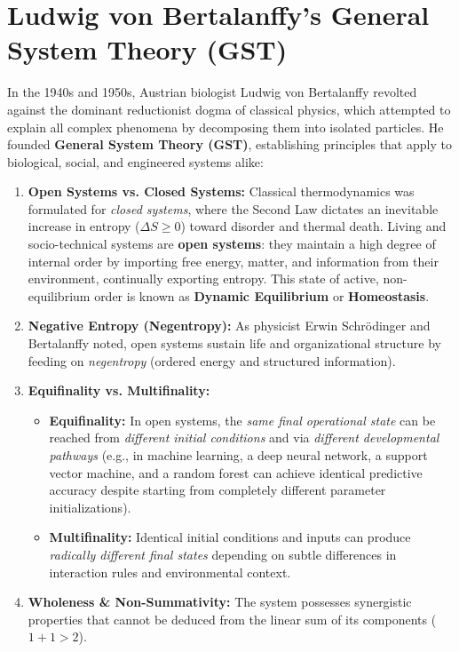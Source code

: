 \section{Ludwig von Bertalanffy's General System Theory (GST)}
\label{sec:gst_bertalanffy}

In the 1940s and 1950s, Austrian biologist Ludwig von Bertalanffy revolted against the dominant reductionist dogma of classical physics, which attempted to explain all complex phenomena by decomposing them into isolated particles. He founded \textbf{General System Theory (GST)}, establishing principles that apply to biological, social, and engineered systems alike:

\begin{enumerate}[leftmargin=2em]
    \item \textbf{Open Systems vs. Closed Systems:} 
    Classical thermodynamics was formulated for \textit{closed systems}, where the Second Law dictates an inevitable increase in entropy ($\Delta S \ge 0$) toward disorder and thermal death. Living and socio-technical systems are \textbf{open systems}: they maintain a high degree of internal order by importing free energy, matter, and information from their environment, continually exporting entropy. This state of active, non-equilibrium order is known as \textbf{Dynamic Equilibrium} or \textbf{Homeostasis}.
    \item \textbf{Negative Entropy (Negentropy):} 
    As physicist Erwin Schrödinger and Bertalanffy noted, open systems sustain life and organizational structure by feeding on \textit{negentropy} (ordered energy and structured information).
    \item \textbf{Equifinality vs. Multifinality:}
    \begin{itemize}
        \item \textbf{Equifinality:} In open systems, the \textit{same final operational state} can be reached from \textit{different initial conditions} and via \textit{different developmental pathways} (e.g., in machine learning, a deep neural network, a support vector machine, and a random forest can achieve identical predictive accuracy despite starting from completely different parameter initializations).
        \item \textbf{Multifinality:} Identical initial conditions and inputs can produce \textit{radically different final states} depending on subtle differences in interaction rules and environmental context.
    \end{itemize}
    \item \textbf{Wholeness \& Non-Summativity:} The system possesses synergistic properties that cannot be deduced from the linear sum of its components ($1 + 1 > 2$).
\end{enumerate}

